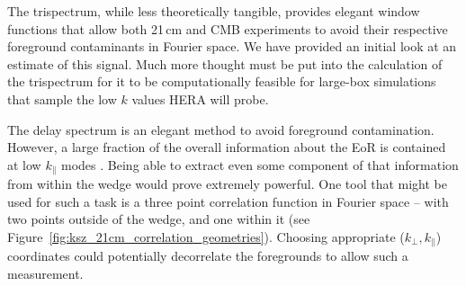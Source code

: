 The trispectrum, while less theoretically tangible, provides elegant window functions that allow both 21\,cm and CMB experiments to avoid their respective foreground contaminants in Fourier space. We have provided an initial look at an estimate of this signal. Much more thought must be put into the calculation of the trispectrum for it to be computationally feasible for large-box simulations that sample the low $k$ values HERA will probe.

The delay spectrum is an elegant method to avoid foreground contamination. However, a large fraction of the overall information about the EoR is contained at low $k_{\parallel}$ modes \citep[e.g.][]{Jensen.16}. Being able to extract even some component of that information from within the wedge would prove extremely powerful. One tool that might be used for such a task is a three point correlation function in Fourier space -- with two points outside of the wedge, and one within it (see Figure~\ref{fig:ksz_21cm_correlation_geometries}). Choosing appropriate ($k_{\perp},k_{\parallel}$) coordinates could potentially decorrelate the foregrounds to allow such a measurement.

